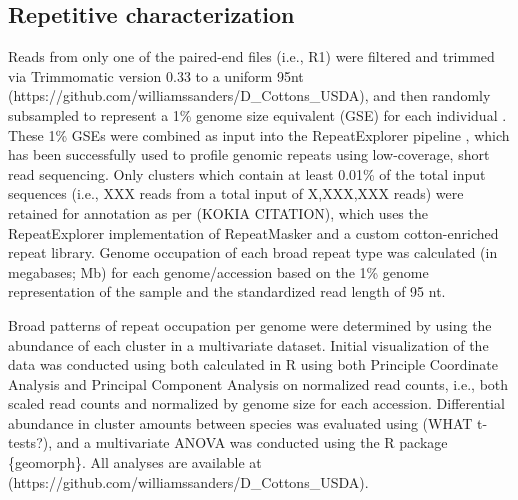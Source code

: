 \documentclass{bmcart}
\newcommand{\note}[2][]{\added[id=#1,remark={#2}]{}}
\begin{document}
\subsection*{Repetitive characterization}
Reads from only one of the paired-end files (i.e., R1) were filtered and trimmed via Trimmomatic version 0.33 \cite{Bolger2014} to a uniform 95nt (https://github.com/williamssanders/D\_Cottons\_USDA), and then randomly subsampled to represent a 1\% genome size equivalent (GSE) for each individual \cite{Hendrix2005, Wendel2002}. These 1\% GSEs were combined as input into the RepeatExplorer pipeline \cite{Novak2013, Novak2010}, which has been successfully used to profile genomic repeats using low-coverage, short read sequencing. Only clusters which contain at least 0.01\% of the total input sequences (i.e., XXX reads from a total input of X,XXX,XXX reads) were retained for annotation as per (KOKIA CITATION), which uses the RepeatExplorer implementation of RepeatMasker \cite{Smit2015} and a custom cotton-enriched repeat library. Genome occupation of each broad repeat type was calculated (in megabases; Mb) for each genome/accession based on the 1\% genome representation of the sample and the standardized read length of 95 nt. 

Broad patterns of repeat occupation per genome were determined by using the abundance of each cluster in a multivariate dataset. Initial visualization of the data was conducted using both calculated in R \note[Corrinne]{citation} using both Principle Coordinate Analysis and Principal Component Analysis on normalized read counts, i.e., both scaled read counts and normalized by genome size for each accession. Differential abundance in cluster amounts between species was evaluated using (WHAT t-tests?), and a multivariate ANOVA was conducted using the R package \{geomorph\}. All analyses are available at (https://github.com/williamssanders/D\_Cottons\_USDA).
\end{document}

